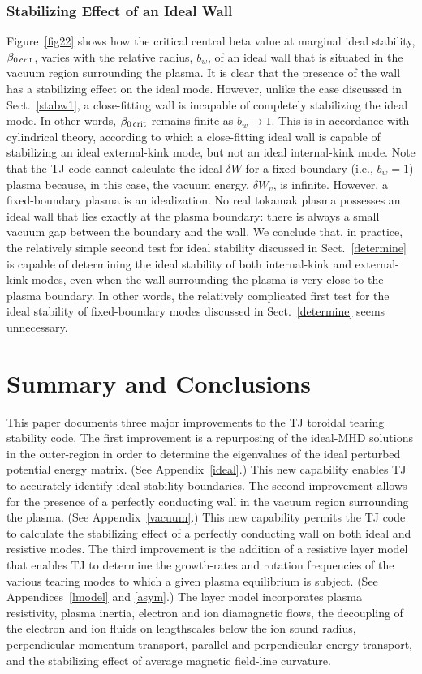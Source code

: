 \documentclass[12pt,prb,aps]{revtex4-1}
\begin{document}
\subsubsection{Stabilizing Effect of an Ideal Wall}
Figure~\ref{fig22} shows how the critical central beta value at marginal ideal stability, $\beta_{0\,{\rm crit}}$, varies with the
relative radius, $b_w$, of an ideal wall that is situated in the vacuum region surrounding the plasma.  It is clear that the
presence of the wall has a stabilizing effect on the ideal mode.   However, unlike the case discussed in Sect.~\ref{stabw1}, a close-fitting wall is incapable of
completely stabilizing the ideal mode. In other words,  $\beta_{0\,{\rm crit}}$ remains finite as $b_w\rightarrow 1$. This is in accordance with cylindrical theory, according to which a close-fitting ideal
wall is capable of stabilizing an ideal external-kink mode, but not an ideal internal-kink mode.\cite{freidberg,wesson}
Note that the TJ code cannot calculate the ideal $\delta W$ for a fixed-boundary (i.e., $b_w=1$)  plasma because, in this
case, the vacuum energy, $\delta W_v$, is infinite. However, a fixed-boundary plasma is an idealization. No real tokamak
plasma possesses an ideal wall that lies exactly at the plasma boundary: there is always a small vacuum gap
between the boundary and the wall. We conclude that, in practice, the relatively simple second test for ideal stability
discussed in Sect.~\ref{determine} is capable of determining the ideal stability of both internal-kink and external-kink
modes, even when the wall surrounding the plasma is very close to the plasma boundary. In other words, the
relatively complicated first test for the ideal stability of fixed-boundary modes discussed in Sect.~\ref{determine}
seems unnecessary. 

\section{Summary and Conclusions}\label{conc}
This paper documents three major improvements to the TJ toroidal tearing stability code.\cite{tj} The first improvement is a repurposing of the
ideal-MHD solutions in the outer-region in order to determine the eigenvalues of the ideal perturbed potential energy matrix. (See Appendix~\ref{ideal}.)
This new capability enables TJ to accurately identify ideal stability boundaries. The second improvement allows for the presence of
a perfectly conducting wall in the vacuum region surrounding the plasma. (See Appendix~\ref{vacuum}.) This new capability permits the TJ code 
to calculate the stabilizing effect of a perfectly conducting wall on both ideal and resistive modes. The third improvement is the addition of
a resistive layer model that enables TJ to determine the  growth-rates and rotation frequencies of the various tearing modes to which a
given plasma equilibrium is subject. (See Appendices~\ref{lmodel} and \ref{asym}.) The layer model incorporates 
plasma resistivity, plasma inertia, electron and ion diamagnetic flows, the decoupling of the electron and ion fluids on lengthscales below the ion sound radius, perpendicular
momentum transport, parallel and perpendicular energy transport, and the stabilizing effect of average magnetic field-line curvature.
\end{document}
